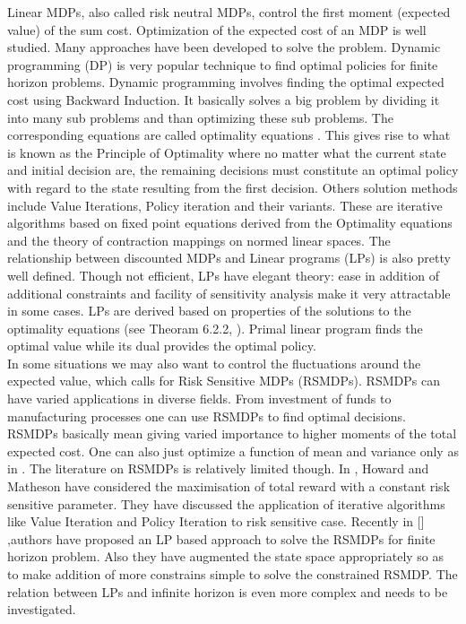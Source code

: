 \documentclass[12pt,a4paper,oneside]{report}
\begin{document}
\noindent Linear MDPs, also called risk neutral MDPs, control the first moment (expected value) of the sum cost. Optimization of the expected cost of an MDP is well studied. Many approaches have been developed to solve the problem. Dynamic programming (DP) is very popular technique to find optimal policies for finite horizon problems. Dynamic programming involves finding the optimal expected cost using Backward Induction. It basically solves a big problem by dividing it into many sub problems and than optimizing these sub problems. The corresponding equations are called optimality equations \citep{puterman1990market}. This gives rise to what is known as the Principle of Optimality where no matter what the current state and initial decision are, the remaining decisions must constitute an optimal policy with regard to the state resulting from the first decision. Others solution methods include Value Iterations, Policy iteration and their variants. These are iterative algorithms based on fixed point equations derived from the Optimality equations and the theory of contraction mappings on normed linear spaces. The relationship between discounted MDPs and Linear programs (LPs) is also pretty well defined. Though not efficient, LPs have elegant theory: ease in addition of additional constraints and facility of sensitivity analysis make it very attractable in some cases. LPs are derived based on properties of the solutions to the optimality equations (see Theoram 6.2.2, \cite{puterman1990market}). Primal linear program finds the optimal value while its dual provides the optimal policy.\\


In some situations we may also want to control the fluctuations around the expected value, which calls for Risk Sensitive MDPs (RSMDPs). RSMDPs can have varied applications in diverse fields. From investment of funds to manufacturing processes one can use RSMDPs to find optimal decisions. RSMDPs basically mean giving varied importance to higher moments of the total expected cost. One can also just optimize a function of mean and variance only as in \citep{mannor2011mean}.  The literature on RSMDPs is relatively limited though. In \cite{howard1972risk}, Howard and Matheson have considered the maximisation of total reward with a constant risk sensitive parameter. They have discussed the application of iterative algorithms like Value Iteration and Policy Iteration to risk sensitive case. Recently in [\citep{kumar2015finite}] ,authors have proposed an LP based approach to solve the RSMDPs for finite horizon problem. Also they have augmented the state space appropriately so as to make addition of more constrains simple to solve the constrained RSMDP. The relation between LPs and infinite horizon is even more complex and needs to be investigated.\\ 
\end{document}
